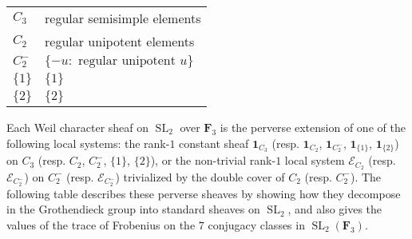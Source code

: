 \documentclass[10pt]{amsart}
\theoremstyle{plain}
\theoremstyle{definition}
\newcommand{\FFF}{{\mathbf{F}_3}}
\DeclareMathOperator{\SL}{SL}
\newcommand{\cs}[1]{{\mathcal{#1}}}
\begin{document}
\begin{center}
\begin{spacing}{1.3}
\begin{tabular}{|l|l|}
\hline
$C_3$ & regular semisimple elements \\
$C_2$ & regular unipotent elements \\
$C_2^-$ & $\{-u : \mbox{ regular unipotent $u$}\}$ \\
$\{1\}$ & $\{1\}$ \\
$\{2\}$ & $\{2\}$ \\
\hline
\end{tabular}
\end{spacing}
\end{center}


\noindent
Each Weil character sheaf on $\SL_2$ over $\FFF$ is the perverse extension of one of the following local systems: the rank-$1$ constant sheaf $\mathbf{1}_{C_3}$ (resp. $\mathbf{1}_{C_2}$, $\mathbf{1}_{C_2^-}$, $\mathbf{1}_{\{1\}}$,  $\mathbf{1}_{\{2\}}$) on $C_3$ (resp. $C_2$, $C_2^-$, $\{1\}$, $\{2\}$), or the non-trivial rank-$1$ local system $\cs{E}_{C_2}$  (resp.  $\cs{E}_{C_2^-}$) on $C_2^{-}$  (resp.  $\cs{E}_{C_2^-}$) trivialized by the double cover of $C_2$ (resp. $C_2^-$).
The following table describes these perverse sheaves by showing how they decompose in the Grothendieck group into standard sheaves on $\SL_2$, and also gives the values of the trace of Frobenius on the $7$ conjugacy classes in $\SL_2(\FFF)$.

\vspace{0.1in}
\end{document}
